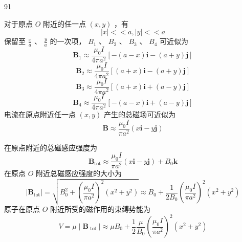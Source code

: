 \begin{solution}{91}
\begin{subsolution}
\end{subsolution}
\begin{subsolution}
对于原点 $O$ 附近的任一点 $(x, y)$ ，有
\begin{equation}
| x | <   <   a, | y | <   <   a
\label{eq:7.s91}
\end{equation}
保留至 $\frac{x}{a}$ 、 $\frac{y}{a}$ 的一次项， $B_{1}$ 、 $B_{2}$ 、 $B_{3}$ 、 $B_{4}$ 可近似为
\begin{equation}
\boldsymbol {B} _ {1} \approx \frac {\mu_ {0} I}{4 \pi a ^ {2}} [ - (a - x) \boldsymbol {i} - (a + y) \boldsymbol {j} ]
\label{eq:8.s91}
\end{equation}
\begin{equation}
\pmb {B} _ {2} \approx \frac {\mu_ {0} I}{4 \pi a ^ {2}} [ (a + x) \pmb {i} - (a + y) \pmb {j} ]
\label{eq:9.s91}
\end{equation}
\begin{equation}
\pmb {B} _ {3} \approx \frac {\mu_ {0} I}{4 \pi a ^ {2}} [ (a + x) \pmb {i} + (a - y) \pmb {j} ]
\label{eq:10.s91}
\end{equation}
\begin{equation}
\boldsymbol {B} _ {4} \approx \frac {\mu_ {0} I}{4 \pi a ^ {2}} [ - (a - x) \boldsymbol {i} + (a - y) \boldsymbol {j} ]
\label{eq:11.s91}
\end{equation}
电流在原点附近任一点 $(x,y)$ 产生的总磁场可近似为
\begin{equation}
\boldsymbol {B} \approx \frac {\mu_ {0} I}{\pi a ^ {2}} (x \boldsymbol {i} - y \boldsymbol {j})
\label{eq:12.s91}
\end{equation}
\end{subsolution}
\begin{subsolution}
在原点附近的总磁感应强度为
\begin{equation}
\pmb {B} _ {\mathrm{tot}} \approx \frac {\mu_ {0} I}{\pi a ^ {2}} (x \pmb {i} - y \pmb {j}) + B _ {0} \pmb {k}
\label{eq:13.s91}
\end{equation}
在原点 $O$ 附近总磁感应强度的大小为
\begin{equation}
\left| \boldsymbol {B} _ {\text {tot}} \right| = \sqrt {B _ {0} ^ {2} + \left(\frac {\mu_ {0} I}{\pi a ^ {2}}\right) ^ {2} \left(x ^ {2} + y ^ {2}\right)} \approx B _ {0} + \frac {1}{2 B _ {0}} \left(\frac {\mu_ {0} I}{\pi a ^ {2}}\right) ^ {2} \left(x ^ {2} + y ^ {2}\right)
\label{eq:14.s91}
\end{equation}
原子在原点 $O$ 附近所受的磁作用的束缚势能为
\begin{equation}
V = \mu \mid \boldsymbol {B} _ {\text { tot }} \mid \approx \mu B _ {0} + \frac {1}{2} \frac {\mu}{B _ {0}} \left(\frac {\mu_ {0} I}{\pi a ^ {2}}\right) ^ {2} (x ^ {2} + y ^ {2})

\end{equation}
\end{subsolution}
\end{solution}
